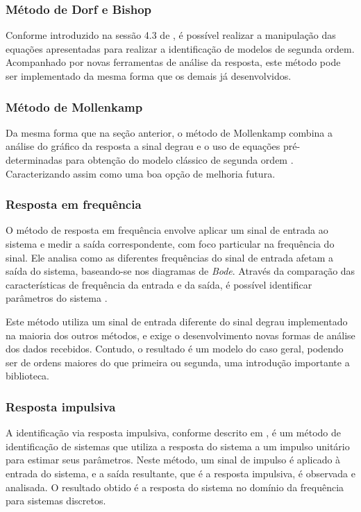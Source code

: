 \subsubsection{Método de Dorf e Bishop}
Conforme introduzido na sessão 4.3 de \cite{CoelhoIdentificacao}, é possível realizar a manipulação das equações
apresentadas para realizar a identificação de modelos de segunda ordem.
Acompanhado por novas ferramentas de análise da resposta, este método pode ser implementado da mesma forma
que os demais já desenvolvidos.

\subsubsection{Método de Mollenkamp}
Da mesma forma que na seção anterior, o método de Mollenkamp combina a análise do gráfico da resposta a sinal degrau
e o uso de equações pré-determinadas para obtenção do modelo clássico de segunda ordem \cite{CoelhoIdentificacao}.
Caracterizando assim como uma boa opção de melhoria futura.

\subsubsection{Resposta em frequência}
O método de resposta em frequência envolve aplicar um sinal de entrada ao sistema e medir a saída correspondente,
com foco particular na frequência do sinal.
Ele analisa como as diferentes frequências do sinal de entrada afetam a saída do sistema, baseando-se nos
diagramas de \textit{Bode}.
Através da comparação das características de frequência da entrada e da saída, é possível identificar parâmetros do
sistema \cite{CoelhoIdentificacao}.

Este método utiliza um sinal de entrada diferente do sinal degrau implementado na maioria dos outros métodos,
e exige o desenvolvimento novas formas de análise dos dados recebidos.
Contudo, o resultado é um modelo do caso geral, podendo ser de ordens maiores do que primeira ou segunda, uma
introdução importante a biblioteca.

\subsubsection{Resposta impulsiva}
A identificação via resposta impulsiva, conforme descrito em \cite{CoelhoIdentificacao}, é um método de identificação
de sistemas que utiliza a resposta do sistema a um impulso unitário para estimar seus parâmetros.
Neste método, um sinal de impulso é aplicado à entrada do sistema, e a saída resultante, que é a resposta impulsiva, é
observada e analisada.
O resultado obtido é a resposta do sistema no domínio da frequência para sistemas discretos.

